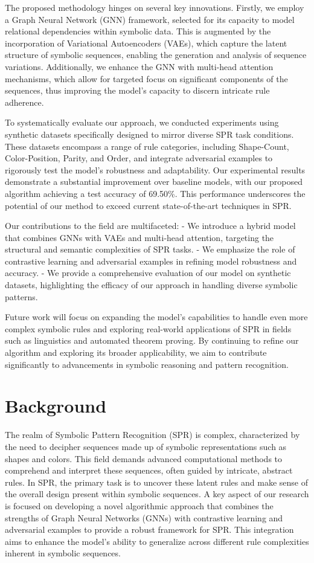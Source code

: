 \documentclass{article}
\begin{document}
The proposed methodology hinges on several key innovations. Firstly, we employ a Graph Neural Network (GNN) framework, selected for its capacity to model relational dependencies within symbolic data. This is augmented by the incorporation of Variational Autoencoders (VAEs), which capture the latent structure of symbolic sequences, enabling the generation and analysis of sequence variations. Additionally, we enhance the GNN with multi-head attention mechanisms, which allow for targeted focus on significant components of the sequences, thus improving the model's capacity to discern intricate rule adherence.

To systematically evaluate our approach, we conducted experiments using synthetic datasets specifically designed to mirror diverse SPR task conditions. These datasets encompass a range of rule categories, including Shape-Count, Color-Position, Parity, and Order, and integrate adversarial examples to rigorously test the model's robustness and adaptability. Our experimental results demonstrate a substantial improvement over baseline models, with our proposed algorithm achieving a test accuracy of 69.50\%. This performance underscores the potential of our method to exceed current state-of-the-art techniques in SPR.

Our contributions to the field are multifaceted:
- We introduce a hybrid model that combines GNNs with VAEs and multi-head attention, targeting the structural and semantic complexities of SPR tasks.
- We emphasize the role of contrastive learning and adversarial examples in refining model robustness and accuracy.
- We provide a comprehensive evaluation of our model on synthetic datasets, highlighting the efficacy of our approach in handling diverse symbolic patterns.

Future work will focus on expanding the model's capabilities to handle even more complex symbolic rules and exploring real-world applications of SPR in fields such as linguistics and automated theorem proving. By continuing to refine our algorithm and exploring its broader applicability, we aim to contribute significantly to advancements in symbolic reasoning and pattern recognition.

\section{Background}

The realm of Symbolic Pattern Recognition (SPR) is complex, characterized by the need to decipher sequences made up of symbolic representations such as shapes and colors. This field demands advanced computational methods to comprehend and interpret these sequences, often guided by intricate, abstract rules. In SPR, the primary task is to uncover these latent rules and make sense of the overall design present within symbolic sequences. A key aspect of our research is focused on developing a novel algorithmic approach that combines the strengths of Graph Neural Networks (GNNs) with contrastive learning and adversarial examples to provide a robust framework for SPR. This integration aims to enhance the model's ability to generalize across different rule complexities inherent in symbolic sequences.
\end{document}
